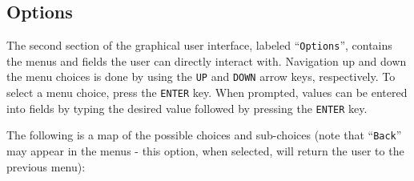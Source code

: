 \documentclass{article}
\begin{document}
\subsection{Options} \label{subsection:options}

The second section of the graphical user interface, labeled ``\verb|Options|'', contains the menus and fields the user can directly interact with. Navigation up and down the menu choices is done by using the \verb|UP| and \verb|DOWN| arrow keys, respectively. To select a menu choice, press the \verb|ENTER| key. When prompted, values can be entered into fields by typing the desired value followed by pressing the \verb|ENTER| key.

The following is a map of the possible choices and sub-choices (note that ``\verb|Back|'' may appear in the menus - this option, when selected, will return the user to the previous menu):
\end{document}
